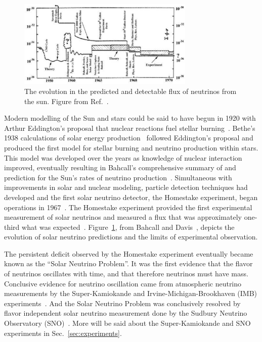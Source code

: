 \begin{figure}[htbp]
\centering
\includegraphics[width=0.75\textwidth]{bahcall_evolution}
\caption[Evolution of Solar Neutrino Predictions and Observations]{
The evolution in the predicted and detectable flux of neutrinos from the sun.
Figure from Ref.~\citep{bahcall_evolution}.}
\label{fig:solar_evolution_cartoon}
\end{figure}

Modern modelling of the Sun and stars could be said to have begun in 1920 with
Arthur Eddington's proposal that nuclear reactions fuel stellar burning~\citep{eddington}.
Bethe's 1938 calculations of solar energy production~\citep{bethe1, bethe2}
followed Eddington's proposal and produced the first model for stellar burning
and neutrino production within stars.
This model was developed over the years as knowledge of nuclear interaction
improved, eventually resulting in Bahcall's comprehensive summary of and
prediction for the Sun's rates of neutrino
production~\citep{bahcall_solar_neutrinos_theory}.
Simultaneous with improvements in solar and nuclear modeling,
particle detection techniques had developed and
the first solar neutrino detector, the Homestake experiment, began
operations in 1967~\citep{homestake_initial}.
The Homestake experiment provided the first experimental measurement
of solar neutrinos and measured a flux that was approximately one-third what was expected~\citep{homestake}.
Figure~\ref{fig:solar_evolution_cartoon}, from Bahcall and Davis~\citep{bahcall_evolution},
depicts the evolution of solar neutrino predictions and
the limits of experimental observation.

The persistent deficit observed by the Homestake experiment
eventually became known as the ``Solar Neutrino Problem''.
It was the first evidence that the flavor of neutrinos oscillates with
time, and that therefore neutrinos must have mass.
Conclusive evidence for neutrino oscillation came from  atmospheric neutrino
measurements by the Super-Kamiokande and Irvine-Michigan-Brookhaven (IMB)
experiments~\citep{superk_atmospherics, imb_atmospherics}.
And the Solar Neutrino Problem was conclusively resolved by flavor
independent solar neutrino measurement done
by the Sudbury Neutrino Observatory (SNO)~\citep{sno_first, sno_second, solar_nu_problem}.
More will be said about the Super-Kamiokande and SNO experiments in
Sec.~\ref{sec:experiments}.

